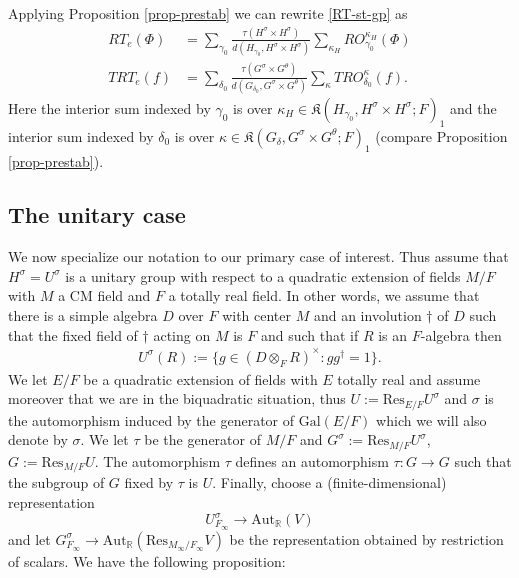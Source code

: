 \documentclass[12pt]{amsart}
\theoremstyle{remark}
\numberwithin{equation}{section}
\newcommand{\Gal}{\mathrm{Gal}}
\newcommand{\lto}{\longrightarrow}
\newcommand{\RR}{\mathbb{R}}
\theoremstyle{definition}
\numberwithin{equation}{subsection}
\begin{document}
Applying Proposition \ref{prop-prestab}  we can rewrite \eqref{RT-st-gp} as
\begin{align} \label{RTe-formula}
RT_e(\Phi)&=\sum_{\gamma_0}
\frac{\tau(H^{\sigma} \times H^{\sigma})}{d(H_{\gamma_0},H^{\sigma} \times H^{\sigma})}
\sum_{\kappa_H}RO^{\kappa_H}_{\gamma_0}(\Phi)\\
\nonumber TRT_e(f)&=\sum_{\delta_0}
\frac{\tau(G^{\sigma} \times G^{\theta})}{d(G_{\delta_0},G^{\sigma} \times G^{\theta})}
\sum_{\kappa}TRO^{\kappa}_{\delta_0}(f).
\end{align}
Here the interior sum indexed by $\gamma_0$ is over $\kappa_H \in \mathfrak{K}(H_{\gamma_0},H^{\sigma} \times H^{\sigma};F)_1$
and the interior sum indexed by $\delta_0$ is over $\kappa \in 
\mathfrak{K}(G_{\delta}, G^{\sigma} \times G^{\theta};F)_1$ (compare Proposition \ref{prop-prestab}).

\subsection{The unitary case}

We now specialize our notation to our primary case of interest.  Thus assume that
$H^{\sigma}=U^{\sigma}$  is a unitary group with respect to a quadratic extension of
fields $M/F$ with $M$ a CM field and $F$ a totally real field.    In other words, we assume that there is a simple algebra $D$ over $F$ with center $M$ and an involution $\dagger$ of $D$ such that the fixed field of $\dagger$ acting on $M$ is $F$ and such that if $R$ is an $F$-algebra then
\begin{align} \label{unitary-gp}
U^{\sigma}(R):=\{g \in (D \otimes_F R)^{\times}: gg^{\dagger}=1\}.
\end{align}
We let $E/F$ be a quadratic extension of fields with $E$ totally real and assume moreover that we are in the biquadratic situation,
thus $U:=\mathrm{Res}_{E/F}U^{\sigma}$ and $\sigma$ is the
automorphism induced by the generator of $\Gal(E/F)$
which we will also denote by $\sigma$.  We let $\tau$
be the generator of $M/F$ and $G^{\sigma}:=\mathrm{Res}_{M/F}U^{\sigma}$, $G:=\mathrm{Res}_{M/F}U$.  The automorphism $\tau$ defines an automorphism $\tau:G \to G$ such that the subgroup of $G$ fixed by $\tau$ is $U$.  Finally, choose a (finite-dimensional) representation
$$
U^{\sigma}_{F_{\infty}} \lto \mathrm{Aut}_{\RR}(V)
$$
and let $G^{\sigma}_{F_{\infty}} \to \mathrm{Aut}_{\RR}(\mathrm{Res}_{M_{\infty}/F_{\infty}}V)$ be the representation obtained by restriction of scalars.
  We have the following proposition:
\end{document}
